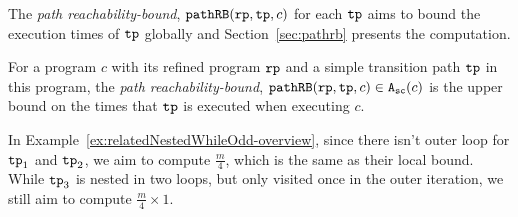 The \emph{path reachability-bound}, $\mathtt{pathRB}(\mathtt{rp}, \mathtt{tp}, c)$ for each $\mathtt{tp}$
aims to bound the execution times of $\mathtt{tp}$ globally
and Section~\ref{sec:pathrb} presents the computation.
%
\begin{defn}
For a program $c$ with its refined program $\mathtt{rp}$ and a simple transition path $\mathtt{tp}$ in this program, 
the \emph{path reachability-bound}, $\mathtt{pathRB}(\mathtt{rp}, \mathtt{tp}, c) \in {\ensuremath{\mathtt{A_{sc}}}}(c)$ is the upper bound on the
times that $\mathtt{tp}$ is executed when executing $c$.
\end{defn}
%
In Example~\ref{ex:relatedNestedWhileOdd-overview}, since there isn't outer loop for $\mathtt{tp}_1$ and $\mathtt{tp}_2$, we aim to compute $\frac{m}{4}$, which is the same as their local bound.
While $\mathtt{tp}_3$ is nested in two loops, but only visited once in the outer iteration, we still aim to compute $\frac{m}{4} \times 1$.

